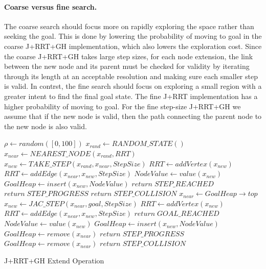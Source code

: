 \documentclass[conference]{IEEEtran}
\begin{document}
\paragraph{Coarse versus fine search.}
The coarse search should focus more on rapidly exploring the space rather
than seeking the goal.  This is done by lowering the probability of moving
to goal in the coarse J+RRT+GH implementation, which also lowers the
exploration cost.  Since the coarse J+RRT+GH takes large step sizes, for each
node extension, the link between the new node and its parent must be checked 
for validity by iterating through its length at an acceptable resolution and 
making sure each smaller step is valid.  In contrst, the fine search should 
focus on exploring a small region with a greater intent to find the final
goal state.  The fine J+RRT implementation has a higher probability of moving 
to goal.  For the fine step-size J+RRT+GH we assume that if the new node is
valid, then the path connecting the parent node to the new node is also valid. 

\begin{algorithm}
  \label{alg:extend}
  \SetAlgoLined

  $\rho \leftarrow random([0,100])$\;
   {
    $x_{rand} \leftarrow RANDOM\_STATE()$\;
    $x_{near} \leftarrow NEAREST\_NODE(x_{rand}, RRT)$\;
    $x_{new} \leftarrow TAKE\_STEP(x_{rand}, x_{near}, StepSize)$\;
	 {
      $RRT \leftarrow addVertex(x_{new})$\;
      $RRT \leftarrow addEdge(x_{near}, x_{new}, StepSize)$\;
      $NodeValue \leftarrow value(x_{new})$\;
      $GoalHeap \leftarrow insert(x_{new}, NodeValue)$\;
	   {
        $return \; STEP\_REACHED$\;
       }{
        $return \; STEP\_PROGRESS$\;
       }
     }{
       $return \; STEP\_COLLISION$\;
     }	
   }{	
    $x_{near} \leftarrow GoalHeap \rightarrow top$\;
    $x_{new} \leftarrow JAC\_STEP(x_{near}, goal, StepSize)$\;
	 {
      $RRT \leftarrow addVertex(x_{new})$\;
      $RRT \leftarrow addEdge(x_{near}, x_{new}, StepSize)$\;
	   {
        $return \; GOAL\_REACHED$\;
       }{
        $NodeValue \leftarrow value(x_{new})$\;
        $GoalHeap \leftarrow insert(x_{new}, NodeValue)$\;
        $GoalHeap \leftarrow remove(x_{near})$\;
        $return \; STEP\_PROGRESS$\;
       }	
     }{
       $GoalHeap \leftarrow remove(x_{near})$\;
       $return \; STEP\_COLLISION$\;
     }
   }
  \caption{J+RRT+GH Extend Operation}
\end{algorithm}
\end{document}
